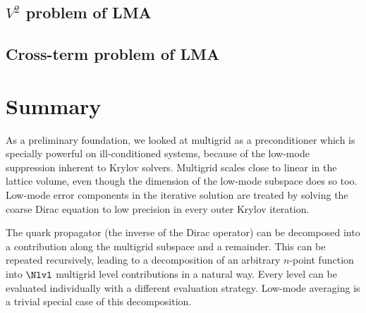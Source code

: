 \subsection{$V^2$ problem of LMA}


\subsection{Cross-term problem of LMA}



\section{Summary}
\label{sec:mg:summary}

As a preliminary foundation, we looked at multigrid as a preconditioner which is specially powerful on ill-conditioned systems, because of the low-mode suppression inherent to Krylov solvers.
Multigrid scales close to linear in the lattice volume, even though the dimension of the low-mode subspace does so too.
Low-mode error components in the iterative solution are treated by solving the coarse Dirac equation to low precision in every outer Krylov iteration.

The quark propagator (the inverse of the Dirac operator) can be decomposed into a contribution along the multigrid subspace and a remainder.
This can be repeated recursively, leading to a decomposition of an arbitrary $n$-point function into $\Nlvl$ multigrid level contributions in a natural way.
Every level can be evaluated individually with a different evaluation strategy.
Low-mode averaging is a trivial special case of this decomposition.

